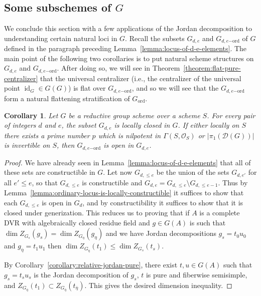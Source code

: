 \documentclass[11pt,reqno]{amsart}
\newtheorem{cor}[theorem]{Corollary}
\theoremstyle{definition}
\renewcommand{\rm}{\mathrm}
\newcommand{\sD}{{\mathscr D}}
\newcommand{\sO}{{\mathscr O}}
\DeclareMathOperator{\id}{id}
\begin{document}
\subsection{Some subschemes of $G$}

We conclude this section with a few applications of the Jordan decomposition to understanding certain natural loci in $G$. Recall the subsets $G_{d,e}$ and $G_{d,e\rm{-ord}}$ of $G$ defined in the paragraph preceding Lemma~\ref{lemma:locus-of-d-e-elements}. The main point of the following two corollaries is to put natural scheme structures on $G_{d, e}$ and $G_{d,e\rm{-ord}}$. After doing so, we will see in Theorem~\ref{theorem:flat-pure-centralizer} that the universal centralizer (i.e., the centralizer of the universal point $\id_G \in G(G)$) is flat over $G_{d,e\rm{-ord}}$, and so we will see that the $G_{d,e\rm{-ord}}$ form a natural flattening stratification of $G_{\rm{ord}}$. 

\begin{cor}\label{cor:openness-of-d-e-locus}
Let $G$ be a reductive group scheme over a scheme $S$. For every pair of integers $d$ and $e$, the subset $G_{d,e}$ is locally closed in $G$. If either locally on $S$ there exists a prime number $p$ which is nilpotent in $\Gamma(S, \sO_S)$ or $|\pi_1(\sD(G))|$ is invertible on $S$, then $G_{d,e\rm{-ord}}$ is open in $G_{d, e}$.
\end{cor}

\begin{proof}
We have already seen in Lemma~\ref{lemma:locus-of-d-e-elements} that all of these sets are constructible in $G$. Let now $G_{d, \leq e}$ be the union of the sets $G_{d, e'}$ for all $e' \leq e$, so that $G_{d, \leq e}$ is constructible and $G_{d, e} = G_{d, \leq e} \setminus G_{d, \leq e-1}$. Thus by Lemma~\ref{lemma:ordinary-locus-is-locally-constructible} it suffices to show that each $G_{d, \leq e}$ is open in $G_d$, and by constructibility it suffices to show that it is closed under generization. This reduces us to proving that if $A$ is a complete DVR with algebraically closed residue field and $g \in G(A)$ is such that $\dim Z_{G_s}(g_s) = \dim Z_{G_\eta}(g_\eta)$ and we have Jordan decompositions $g_s = t_0 u_0$ and $g_{\overline{\eta}} = t_1 u_1$ then $\dim Z_{G_{\overline{\eta}}}(t_1) \leq \dim Z_{G_s}(t_s)$. \smallskip

By Corollary~\ref{corollary:relative-jordan-pure}, there exist $t, u \in G(A)$ such that $g_s = t_s u_s$ is the Jordan decomposition of $g_s$, $t$ is pure and fiberwise semisimple, and $Z_{G_{\overline{\eta}}}(t_1) \subset Z_{G_{\overline{\eta}}}(t_{\overline{\eta}})$. This gives the desired dimension inequality.
\end{proof}
\end{document}
